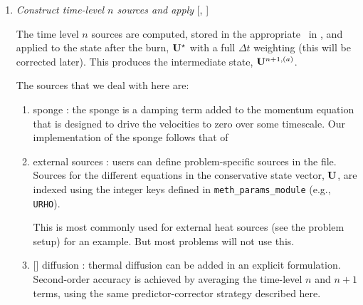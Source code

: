 \begin{enumerate}
  The reaction data needs to be valid in the ghost cells.  The logic
  in this routine (accomplished throuh the use of a mask) will burn
  only in the valid interior cells or in any ghost cells that are on a
  coarse-fine interface or physical boundary.  This allows us to just
  use a level {\tt FillBoundary()} call to fill all of the ghost cells
  on the same level with valid data.

  An experimental option (enabled via
  ) will create a custom
  distribution map based on the work needed in burning a zone and
  redistribute the boxes across processors before burning, to better
  load balance..  

  At the end of this step,  sees the effects of the
  reactions.


\item \label{strang:oldsource} {\em Construct time-level $n$ sources and apply} 
  [, ]

  The time level $n$ sources are computed, stored in the appropriate
  \multifab\ in , and applied to the state
  after the burn, ${\bf U}^\star$ with a full $\Delta t$ weighting (this
  will be corrected later).  This produces the intermediate state,
  ${\bf U}^{n+1,(a)}$.

  The sources that we deal with here are:
  \begin{enumerate}
  \item sponge : the sponge is a damping term added to
    the momentum equation that is designed to drive the velocities to
    zero over some timescale.  Our implementation of the sponge
    follows that of \maestro~\cite{maestro:III}

  \item external sources : users can define problem-specific sources
    in the  file.  Sources for the different
    equations in the conservative state vector, ${\bf U}$, are indexed
    using the integer keys defined in {\tt meth\_params\_module}
    (e.g., {\tt URHO}).

    This is most commonly used for external heat sources (see the
     problem setup) for an example.  But most
    problems will not use this.

  \item {[]} diffusion : thermal diffusion can be
    added in an explicit formulation.  Second-order accuracy is
    achieved by averaging the time-level $n$ and $n+1$ terms, using
    the same predictor-corrector strategy described here.


\end{enumerate}
\end{enumerate}
